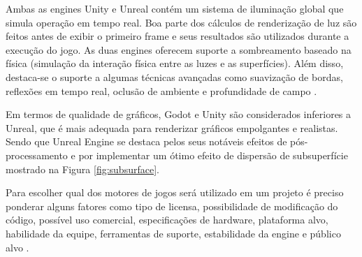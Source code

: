 

Ambas as engines Unity e Unreal contém um sistema de iluminação global que simula operação em tempo real. Boa parte dos cálculos de renderização de luz são feitos antes de exibir o primeiro frame e seus resultados são utilizados durante a execução do jogo. As duas engines oferecem suporte a sombreamento baseado na física (simulação da interação física entre as luzes e as superfícies). Além disso, destaca-se o suporte a algumas técnicas avançadas como suavização de bordas, reflexões em tempo real, oclusão de ambiente e profundidade de campo \cite{compStudyGE}. 

Em termos de qualidade de gráficos, Godot e Unity são considerados inferiores a Unreal, que é mais adequada para renderizar gráficos empolgantes e realistas. Sendo que Unreal Engine se destaca pelos seus notáveis efeitos de pós-processamento e por implementar um ótimo efeito de dispersão de subsuperfície mostrado na Figura \ref{fig:subsurface}.

\begin{figure}[h!]
	\centering
\end{figure}
\nocite{subsurface}

Para escolher qual dos motores de jogos será utilizado em um projeto é preciso ponderar alguns fatores como tipo de licensa, possibilidade de modificação do código, possível uso comercial, especificações de hardware, plataforma alvo, habilidade da equipe, ferramentas de suporte, estabilidade da engine e público alvo \cite{navarro2012}.

